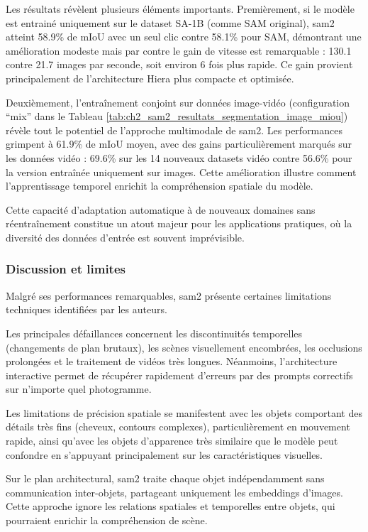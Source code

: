 Les résultats révèlent plusieurs éléments importants. Premièrement, si le modèle est entrainé uniquement sur le dataset SA-1B (comme SAM original), \acrshort{sam2} atteint 58.9\% de mIoU avec un seul clic contre 58.1\% pour SAM, démontrant une amélioration modeste mais par contre le gain de vitesse est remarquable : 130.1 contre 21.7 images par seconde, soit environ 6 fois plus rapide. Ce gain provient principalement de l'architecture Hiera plus compacte et optimisée.

Deuxièmement, l'entraînement conjoint sur données image-vidéo (configuration ``mix'' dans le Tableau \ref{tab:ch2_sam2_resultats_segmentation_image_miou}) révèle tout le potentiel de l'approche multimodale de \acrshort{sam2}. Les performances grimpent à 61.9\% de mIoU moyen, avec des gains particulièrement marqués sur les données vidéo : 69.6\% sur les 14 nouveaux datasets vidéo contre 56.6\% pour la version entraînée uniquement sur images. Cette amélioration illustre comment l'apprentissage temporel enrichit la compréhension spatiale du modèle.

Cette capacité d'adaptation automatique à de nouveaux domaines sans réentraînement constitue un atout majeur pour les applications pratiques, où la diversité des données d'entrée est souvent imprévisible.

\subsubsection{Discussion et limites}
Malgré ses performances remarquables, \acrshort{sam2} présente certaines limitations techniques identifiées par les auteurs.

Les principales défaillances concernent les discontinuités temporelles (changements de plan brutaux), les scènes visuellement encombrées, les occlusions prolongées et le traitement de vidéos très longues. Néanmoins, l'architecture interactive permet de récupérer rapidement d'erreurs par des prompts correctifs sur n'importe quel photogramme.

Les limitations de précision spatiale se manifestent avec les objets comportant des détails très fins (cheveux, contours complexes), particulièrement en mouvement rapide, ainsi qu'avec les objets d'apparence très similaire que le modèle peut confondre en s'appuyant principalement sur les caractéristiques visuelles.

Sur le plan architectural, \acrshort{sam2} traite chaque objet indépendamment sans communication inter-objets, partageant uniquement les embeddings d'images. Cette approche ignore les relations spatiales et temporelles entre objets, qui pourraient enrichir la compréhension de scène.

